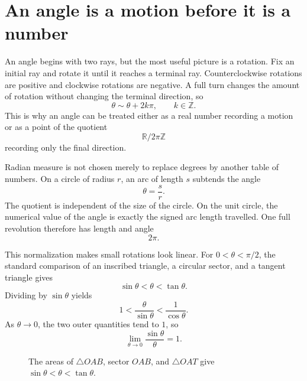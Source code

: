 
\section{An angle is a motion before it is a number}

An angle begins with two rays, but the most useful picture is a rotation.  Fix an initial ray and rotate it until it reaches a terminal ray.  Counterclockwise rotations are positive and clockwise rotations are negative.  A full turn changes the amount of rotation without changing the terminal direction, so
\[
  \theta\sim\theta+2k\pi,
  \qquad k\in\mathbb Z.
\]
This is why an angle can be treated either as a real number recording a motion or as a point of the quotient
\[
  \mathbb R/2\pi\mathbb Z
\]
recording only the final direction.

Radian measure is not chosen merely to replace degrees by another table of numbers.  On a circle of radius \(r\), an arc of length \(s\) subtends the angle
\[
  \theta=\frac{s}{r}.
\]
The quotient is independent of the size of the circle.  On the unit circle, the numerical value of the angle is exactly the signed arc length travelled.  One full revolution therefore has length and angle
\[
  2\pi.
\]

This normalization makes small rotations look linear.  For \(0<\theta<\pi/2\), the standard comparison of an inscribed triangle, a circular sector, and a tangent triangle gives
\[
  \sin\theta<\theta<\tan\theta.
\]
Dividing by \(\sin\theta\) yields
\[
  1<\frac{\theta}{\sin\theta}<\frac1{\cos\theta}.
\]
As \(\theta\to0\), the two outer quantities tend to \(1\), so
\[
  \lim_{\theta\to0}\frac{\sin\theta}{\theta}=1.
\]

\begin{figure}[H]
\centering
{}
\caption{The areas of \(\triangle OAB\), sector \(OAB\), and \(\triangle OAT\) give \(\sin\theta<\theta<\tan\theta\).}
\end{figure}

